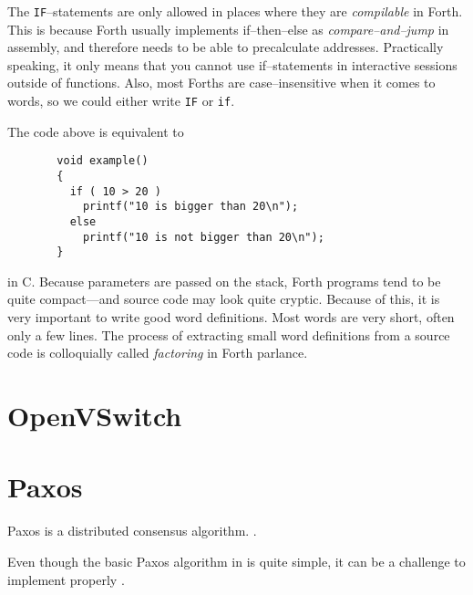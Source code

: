 The \texttt{IF}--statements are only allowed in places where they are
\textit{compilable} in Forth. This is because Forth usually implements
if--then--else as \textit{compare--and--jump} in assembly, and therefore
needs to be able to precalculate addresses.  Practically speaking, it only
means that you cannot use if--statements in interactive sessions outside of
functions.  Also, most Forths are case--insensitive when it comes to
words, so we could either write \texttt{IF} or \texttt{if}.

The code above is equivalent to

\begin{figure}[H]
  \centering
  \begin{Verbatim}
  void example()
  {
    if ( 10 > 20 )
      printf("10 is bigger than 20\n");
    else
      printf("10 is not bigger than 20\n");
  }
  \end{Verbatim}
\end{figure}

in C.  Because parameters are passed on the stack, Forth programs tend to be
quite compact---and source code may look quite cryptic.  Because of this, it
is very important to write good word definitions.  Most words are very
short, often only a few lines.  The process of extracting small word
definitions from a source code is colloquially called \textit{factoring} in
Forth parlance.

\section{OpenVSwitch}

\section{Paxos}
Paxos is a distributed consensus algorithm.
.

Even though the basic Paxos algorithm in \cite{Lam01} is quite simple, it can be
a challenge to implement properly \cite{Chandra:2007:PML:1281100.1281103}.
